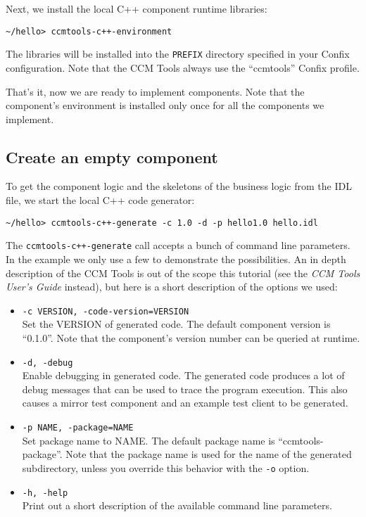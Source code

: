 Next, we install the local C++ component runtime libraries:
\begin{small}
\begin{verbatim}
~/hello> ccmtools-c++-environment
\end{verbatim}
\end{small}
The libraries will be installed into the {\tt PREFIX} directory specified in
your Confix configuration. Note that the CCM Tools always use the ``ccmtools''
Confix profile.

That's it, now we are ready to implement components. Note that the component's
environment is installed only once for all the components we implement.

\subsection{Create an empty component}

To get the component logic and the skeletons of the business logic from the IDL
file, we start the local C++ code generator:
\begin{small}
\begin{verbatim}
~/hello> ccmtools-c++-generate -c 1.0 -d -p hello1.0 hello.idl
\end{verbatim}
\end{small}

The {\tt ccmtools-c++-generate} call accepts a bunch of command line parameters.
In the example we only use a few to demonstrate the possibilities. An in depth
description of the CCM Tools is out of the scope this tutorial (see the {\it CCM
Tools User's Guide} instead), but here is a short description of the options we
used:
\begin{itemize}
\item {\tt -c VERSION, -\-code-version=VERSION }\\
Set the VERSION of generated code. The default component version is ``0.1.0''.
Note that the component's version number can be queried at runtime.

\item {\tt -d, -\-debug }\\
Enable debugging in generated code. The generated code produces a lot of debug
messages that can be used to trace the program execution. This also causes a
mirror test component and an example test client to be generated.

\item {\tt -p NAME, -\-package=NAME}\\
Set package name to NAME. The default package name is ``ccmtools-package''. Note
that the package name is used for the name of the generated subdirectory, unless
you override this behavior with the {\tt -o} option.

\item {\tt -h, -\-help}\\
Print out a short description of the available command line parameters.
\end{itemize}


